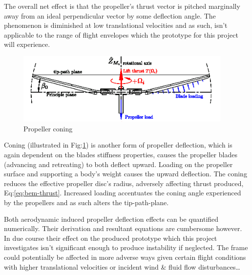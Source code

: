 \par
The overall net effect is that the propeller's thrust vector is pitched marginally away from an ideal perpendicular vector by some deflection angle. The phenomenon is diminished at low translational velocities and as such, isn't applicable to the range of flight envelopes which the prototype for this project will experience.
\par
\begin{figure}[hbtp]
\centering
\includegraphics[width=0.95\textwidth]{figs/prop-coning}
\caption{Propeller coning}
\label{fig:prop-coning}
\end{figure}
Coning (illustrated in Fig:\ref{fig:prop-coning}) is another form of propeller deflection, which is again dependent on the blades stiffness properties, causes the propeller blades (advancing and retreating) to both deflect upward. Loading on the propeller surface and supporting a body's weight causes the upward deflection. The coning reduces the effective propeller disc's radius, adversely affecting thrust produced, Eq:\ref{eq:bem-thrust}. Increased loading accentuates the coning angle experienced by the propellers and as such alters the tip-path-plane.
\par
Both aerodynamic induced propeller deflection effects can be quantified numerically. Their derivation and resultant equations are cumbersome however. In due course their effect on the produced prototype which this project investigates isn't significant enough to produce instability if neglected. The frame could potentially be affected in more adverse ways given certain flight conditions with higher translational velocities or incident wind \& fluid flow disturbances\ldots
